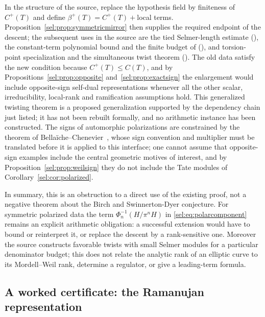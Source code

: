 \begin{remark}\label{sel:rem:refactor}
In the structure  of the source, replace the hypothesis field
 by
finiteness of $C^+(T)$ and define $\beta^+(T)=C^+(T)+{}$local terms.
Proposition~\ref{sel:prop:symmetricmirror} then supplies the required endpoint of the
descent; the subsequent uses in the source are the tied Selmer-length
estimate (), the constant-term polynomial bound and the
finite budget of  (), and
torsion-point specialization and the simultaneous twist theorem
(). The old data satisfy the new condition because
$C^+(T)\le C(T)$, and by Propositions~\ref{sel:prop:opposite} and~\ref{sel:prop:exactsign} the
enlargement would include opposite-sign self-dual representations whenever
all the other scalar, irreducibility, local-rank and ramification
assumptions hold. This generalized twisting theorem is a proposed
generalization supported by the dependency chain just listed; it has not been
rebuilt formally, and no arithmetic instance has been constructed. The
signs of automorphic polarizations are constrained by the theorem of
Bella\"iche--Chenevier~\cite{Bellaiche2011Sign}, whose sign convention and
multiplier must be translated before it is applied to this interface; one
cannot assume that opposite-sign examples include the central geometric
motives of interest, and by Proposition~\ref{sel:prop:weilsign} they do not include
the Tate modules of Corollary~\ref{sel:cor:polarized}.
\end{remark}

In summary, this is an obstruction to a direct use of the existing proof,
not a negative theorem about the Birch and Swinnerton-Dyer conjecture. For
symmetric polarized data the term $\Phi_n^{-1}(H/\pi^nH)$ in
\eqref{sel:eq:polarcomponent} remains an explicit arithmetic obligation: a
successful extension would have to bound or reinterpret it, or replace the
descent by a rank-sensitive one. Moreover the source constructs favorable
twists with small Selmer modules for a particular denominator budget; this
does not relate the analytic rank of an elliptic curve to its Mordell--Weil
rank, determine a regulator, or give a leading-term formula.

\subsection{A worked certificate: the Ramanujan representation}\label{sel:sec:delta}

